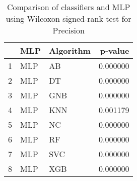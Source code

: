 \begin{table}
\footnotesize
\caption{Comparison of classifiers and MLP using Wilcoxon signed-rank test for Precision}
\label{tab:MLP wilcoxon Precision comparison}
\begin{tabular}{lllr}
\hline
 & MLP & Algorithm & p-value \\
\hline
1 & MLP & AB & 0.000000 \\
2 & MLP & DT & 0.000000 \\
3 & MLP & GNB & 0.000000 \\
4 & MLP & KNN & 0.001179 \\
5 & MLP & NC & 0.000000 \\
6 & MLP & RF & 0.000000 \\
7 & MLP & SVC & 0.000000 \\
8 & MLP & XGB & 0.000000 \\
\hline
\end{tabular}
\end{table}
